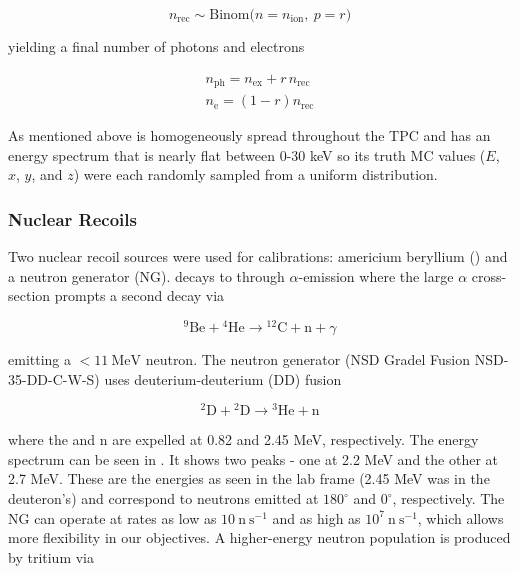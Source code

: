 \begin{equation}
n_{\mathrm{rec}} \sim \mathrm{Binom} \Big(n = n_{\mathrm{ion}},\ p = r \Big)
\end{equation}

\noindent yielding a final number of photons and electrons

\begin{equation}
\begin{aligned}
n_{\mathrm{ph}} = n_{\mathrm{ex}} + r\, n_{\mathrm{rec}} \\
n_{\mathrm{e}} = (1 - r) n_{\mathrm{rec}}
\end{aligned}
\end{equation}

\noindent  As mentioned above  is homogeneously spread throughout the TPC and has an energy spectrum that is nearly flat
between 0-30 keV so its truth MC values ($E$, $x$, $y$, and $z$) were each randomly sampled from a uniform distribution.



\subsubsection{Nuclear Recoils}
\label{subsubsec:er_nr_calibrations_parameter_determ_nr}
Two nuclear recoil sources were used for calibrations: americium beryllium (\ambe) and a neutron generator (NG).  \ambe decays to
 through $\alpha$-emission where the large  $\alpha$ cross-section prompts a second decay via

\begin{equation}
\mathrm{^{9}Be} + \mathrm{^{4}He} \rightarrow \mathrm{^{12}C + n} + \gamma
\end{equation}

\noindent emitting a $< 11\ \mathrm{MeV}$ neutron.  The neutron generator (NSD Gradel Fusion NSD-35-DD-C-W-S) uses
deuterium-deuterium (DD) fusion

\begin{equation}
\mathrm{^{2}D} + \mathrm{^{2}D} \rightarrow \mathrm{^{3}He} + \mathrm{n}
\end{equation}

\noindent where the  and n are expelled at 0.82 and 2.45 MeV, respectively.  The energy spectrum can be seen in
.  It shows two peaks - one at 2.2 MeV and the other at 2.7 MeV.  These
are the energies as seen in the lab frame (2.45 MeV was in the deuteron's) and correspond to neutrons emitted at $180^{\circ}$ and
$0^{\circ}$, respectively.  The NG can operate at rates as low as $10\ \mathrm{n\ s^{-1}}$
and as high as $10^7\ \mathrm{n\ s^{-1}}$, which allows more flexibility in our objectives.  A higher-energy neutron
population is produced by tritium via

